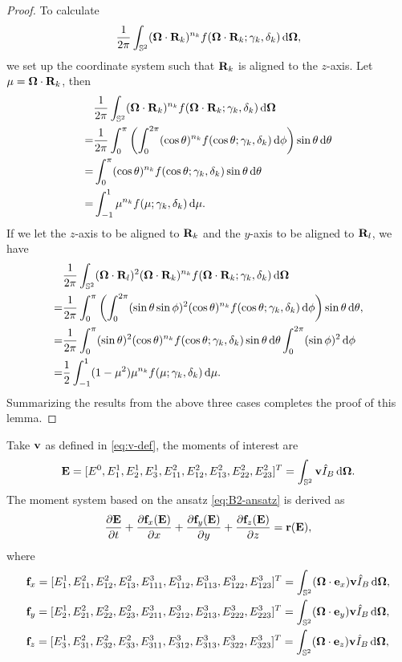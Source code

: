 \begin{proof}
  To calculate
  \[
    \dfrac1{2\pi} \int_{\mathbb{S}^2} (\boldsymbol{\Omega}\cdot\mathbf{R}_k)^{n_k}
    f(\boldsymbol{\Omega}\cdot\mathbf{R}_k; \gamma_k, \delta_k) \,{\rm d}\boldsymbol{\Omega},
  \]
  we set up the coordinate system such that $\mathbf{R}_k$ is aligned to the
  $z$-axis. Let $\mu = \boldsymbol{\Omega}\cdot\mathbf{R}_k$, then
  \[
    \begin{split}
      & \dfrac1{2\pi} \int_{\mathbb{S}^2} (\boldsymbol{\Omega}\cdot\mathbf{R}_k)^{n_k}  
      f(\boldsymbol{\Omega}\cdot\mathbf{R}_k; \gamma_k, \delta_k) \,{\rm d}\boldsymbol{\Omega} \\
      = & \dfrac1{2\pi} \int_0^\pi \left( \int_0^{2\pi} 
    (\cos\theta)^{n_k} f(\cos\theta; \gamma_k, \delta_k) \,{\rm d}\phi \right)
    \sin\theta \,{\rm d}\theta \\
    = & \int_0^{\pi} (\cos\theta)^{n_k} f(\cos\theta; \gamma_k, \delta_k)   
    \sin\theta \,{\rm d}\theta \\
    = & \int_{-1}^1 \mu^{n_k} f(\mu; \gamma_k, \delta_k) \,{\rm d}\mu. 
  \end{split}
\]
If we let the $z$-axis to be aligned to $\mathbf{R}_k$ and the $y$-axis
to be aligned to $\mathbf{R}_l$, we have
\[
  \begin{split}
    & \dfrac1{2\pi} \int_{\mathbb{S}^2} (\boldsymbol{\Omega}\cdot\mathbf{R}_l)^2
    (\boldsymbol{\Omega} \cdot \mathbf{R}_k)^{n_k}
    f(\boldsymbol{\Omega}\cdot\mathbf{R}_k; \gamma_k, \delta_k) \,{\rm d}\boldsymbol{\Omega} \\
    = & \dfrac1{2\pi} \int_0^\pi \left( \int_0^{2\pi}
    (\sin\theta\sin\phi)^2 (\cos\theta)^{n_k} f(\cos\theta; \gamma_k, \delta_k)
  \,{\rm d}\phi \right) \sin\theta \,{\rm d}\theta, \\
  = & \dfrac1{2\pi} \int_0^\pi (\sin\theta)^2 (\cos\theta)^{n_k} 
  f(\cos\theta; \gamma_k, \delta_k) \sin\theta \,{\rm d}\theta
  \int_0^{2\pi} (\sin\phi)^2 \,{\rm d}\phi \\
  = & \dfrac12 \int_{-1}^1 (1-\mu^2) \mu^{n_k} f(\mu; \gamma_k,
  \delta_k) \,{\rm d}\mu. 
\end{split}
  \]
  Summarizing the results from the above three cases completes the proof of 
  this lemma.
\end{proof}
Take $\mathbf{v}$ as defined in \eqref{eq:v-def}, the moments of interest are
\[
    \mathbf{E} = [ E^0,E^1_1,E^1_2,E^1_3, E^2_{11},E^2_{12},E^2_{13},
    E^2_{22},E^2_{23} ]^T = \int_{\mathbb{S}^2} \mathbf{v} \hat I_B \,{\rm d}\boldsymbol{\Omega}.
\]
The moment system based on the ansatz
\eqref{eq:B2-ansatz} is derived as
\begin{equation}\label{eq:moment_model}
  \pd{\bE}{t} + \pd{\bff_x(\bE)}{x} + \pd{\bff_y(\bE)}{y} +
  \pd{\bff_z(\bE)}{z} = \br(\bE),
\end{equation}
where
\[
  \begin{split}
    & \mathbf{f}_x = [E^1_1, E^2_{11}, E^2_{12}, E^2_{13}, E^3_{111},
    E^3_{112}, E^3_{113}, E^3_{122}, E^3_{123}]^T = \int_{\mathbb{S}^2}
    (\boldsymbol{\Omega}\cdot\mathbf{e}_x) \mathbf{v} \hat I_B \,{\rm d}\boldsymbol{\Omega},\\
    & \mathbf{f}_y = [E^1_2, E^2_{21}, E^2_{22}, E^2_{23}, E^3_{211},
    E^3_{212}, E^3_{213}, E^3_{222}, E^3_{223}]^T = \int_{\mathbb{S}^2}
    (\boldsymbol{\Omega}\cdot\mathbf{e}_y) \mathbf{v} \hat I_B \,{\rm d}\boldsymbol{\Omega},\\
    & \mathbf{f}_z = [E^1_3, E^2_{31}, E^2_{32}, E^2_{33}, E^3_{311},
    E^3_{312}, E^3_{313}, E^3_{322}, E^3_{323}]^T = \int_{\mathbb{S}^2}
    (\boldsymbol{\Omega}\cdot\mathbf{e}_z) \mathbf{v} \hat I_B \,{\rm d}\boldsymbol{\Omega},
  \end{split}
\]
